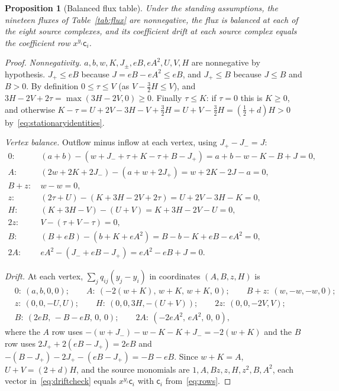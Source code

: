 \documentclass[11pt,a4paper]{article}
\theoremstyle{plain}
\newtheorem{proposition}[theorem]{Proposition}
\theoremstyle{definition}
\theoremstyle{remark}
\newcommand{\cc}{\mathsf{c}}
\begin{document}
\begin{proposition}[Balanced flux table]\label{prop:flux}
Under the standing assumptions, the nineteen fluxes of Table~\ref{tab:flux} are nonnegative, the flux is balanced at each of the eight source complexes, and its coefficient drift at each source complex equals the coefficient row $x^{y_i}\cc_i$.
\end{proposition}
\begin{proof}
\emph{Nonnegativity.} $a,b,w,K,J_\pm,eB,eA^2,U,V,H$ are nonnegative by hypothesis. $J_+\le eB$ because $J=eB-eA^2\le eB$, and $J_+\le B$ because $J\le B$ and $B>0$. By definition $0\le\tau\le V$ (as $V-\frac32H\le V$), and $3H-2V+2\tau=\max(3H-2V,0)\ge0$. Finally $\tau\le K$: if $\tau=0$ this is $K\ge0$, and otherwise
$K-\tau=U+2V-3H-V+\tfrac32H=U+V-\tfrac32H=(\tfrac12+d)H>0$ by~\eqref{eq:stationaryidentities}.

\emph{Vertex balance.} Outflow minus inflow at each vertex, using $J_+-J_-=J$:
\begin{align*}
0:&\ (a+b)-(w+J_-+\tau+K-\tau+B-J_+)=a+b-w-K-B+J=0,\\
A:&\ (2w+2K+2J_-)-(a+w+2J_+)=w+2K-2J-a=0,\\
B+z:&\ w-w=0,\\
z:&\ (2\tau+U)-(K+3H-2V+2\tau)=U+2V-3H-K=0,\\
H:&\ (K+3H-V)-(U+V)=K+3H-2V-U=0,\\
2z:&\ V-(\tau+V-\tau)=0,\\
B:&\ (B+eB)-(b+K+eA^2)=B-b-K+eB-eA^2=0,\\
2A:&\ eA^2-(J_-+eB-J_+)=eA^2-eB+J=0 .
\end{align*}

\emph{Drift.} At each vertex, $\sum_jq_{ij}(y_j-y_i)$ in coordinates $(A,B,z,H)$ is
\begin{equation}\label{eq:driftcheck}
\begin{aligned}
&0:\ (a,b,0,0);\qquad A:\ (-2(w+K),\,w+K,\,w+K,\,0);\qquad B+z:\ (w,-w,-w,0);\\
&z:\ (0,0,-U,U);\qquad H:\ (0,0,3H,-(U+V));\qquad 2z:\ (0,0,-2V,V);\\
&B:\ (2eB,\,-B-eB,\,0,\,0);\qquad 2A:\ (-2eA^2,\,eA^2,\,0,\,0),
\end{aligned}
\end{equation}
where the $A$ row uses $-(w+J_-)-w-K-K+J_-=-2(w+K)$ and the $B$ row uses $2J_++2(eB-J_+)=2eB$ and $-(B-J_+)-2J_+-(eB-J_+)=-B-eB$. Since $w+K=A$, $U+V=(2+d)H$, and the source monomials are $1,A,Bz,z,H,z^2,B,A^2$, each vector in~\eqref{eq:driftcheck} equals $x^{y_i}\cc_i$ with $\cc_i$ from~\eqref{eq:rows}.
\end{proof}
\end{document}

